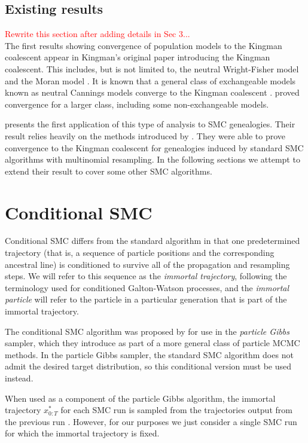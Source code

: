 \documentclass[fleqn]{article}
\begin{document}
\subsection{Existing results}
\textcolor{red}{
Rewrite this section after adding details in Sec 3...
}\\
The first results showing convergence of population models to the Kingman coalescent appear in Kingman's original paper \citep{kingman1982gene} introducing the Kingman coalescent. This includes, but is not limited to, the neutral Wright-Fisher model \citep{fisher1923, fisher1930, wright1931} and the Moran model \citep{moran1958}.
It is known that a general class of exchangeable models known as neutral Cannings models converge to the Kingman coalescent \citep[Section 2.2]{etheridge2011}.
\citet{mohle1998} proved convergence for a larger class, including some non-exchangeable models.

\citet{koskela2018} presents the first application of this type of analysis to SMC genealogies. Their result relies heavily on the methods introduced by \citet{mohle1998}.
They were able to prove convergence to the Kingman coalescent for genealogies induced by standard SMC algorithms with multinomial resampling.
In the following sections we attempt to extend their result to cover some other SMC algorithms.


\section{Conditional SMC}
Conditional SMC differs from the standard algorithm in that one predetermined trajectory (that is, a sequence of particle positions and the corresponding ancestral line) is conditioned to survive all of the propagation and resampling steps. 
We will refer to this sequence as the \emph{immortal trajectory}, following the terminology used for conditioned Galton-Watson processes, and the \emph{immortal particle} will refer to the particle in a particular generation that is part of the immortal trajectory.

The conditional SMC algorithm was proposed by \citet{andrieu2010} for use in the \emph{particle Gibbs} sampler, which they introduce as part of a more general class of particle MCMC methods. 
In the particle Gibbs sampler, the standard SMC algorithm does not admit the desired target distribution, so this conditional version must be used instead.

When used as a component of the particle Gibbs algorithm, the immortal trajectory $x_{0:T}^*$ for each SMC run is sampled from the trajectories output from the previous run \citep[Section 2.4.3]{andrieu2010}. However, for our purposes we just consider a single SMC run for which the immortal trajectory is fixed.
\end{document}
